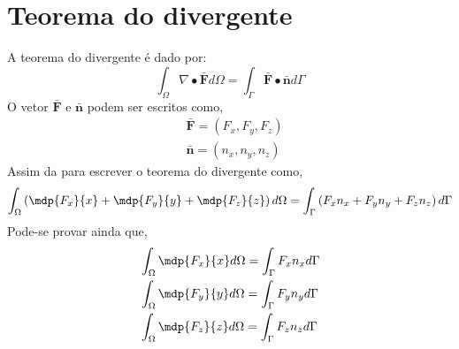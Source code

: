 \section{Teorema do divergente}

A teorema do divergente é dado por:
%
\begin{equation}
	\int_{\Omega} \nabla \bullet \pmb{\bar F} d \Omega = \int_{\Gamma} \pmb{\bar F} \bullet \pmb{\bar n} d \Gamma
\end{equation} 
%
O vetor $\pmb{\bar F}$ e  $\pmb{\bar n}$ podem ser escritos como,
%
\begin{equation}
	\begin{split}
	&\pmb{\bar F} = \left(F_x, F_y, F_z\right)\\
	&\pmb{\bar n} = \left(n_x, n_y, n_z\right)
	\end{split}
\end{equation} 
%
Assim da para escrever o teorema do divergente como,
%
\begin{equation}
\int_{\Omega} \left(\mdp{F_x}{x} + \mdp{F_y}{y} + \mdp{F_z}{z}\right) d \Omega = \int_{\Gamma} \left(F_x n_x + F_y n_y + F_z n_z\right) d \Gamma
\end{equation}
%
Pode-se provar ainda que,
%
\begin{equation}
	\begin{split}
		&\int_{\Omega} \mdp{F_x}{x} d \Omega = \int_{\Gamma} F_x n_x d \Gamma\\
		&\int_{\Omega} \mdp{F_y}{y} d \Omega = \int_{\Gamma} F_y n_y d \Gamma\\
		&\int_{\Omega} \mdp{F_z}{z} d \Omega = \int_{\Gamma} F_z n_z d \Gamma
	\end{split}
\end{equation} 
